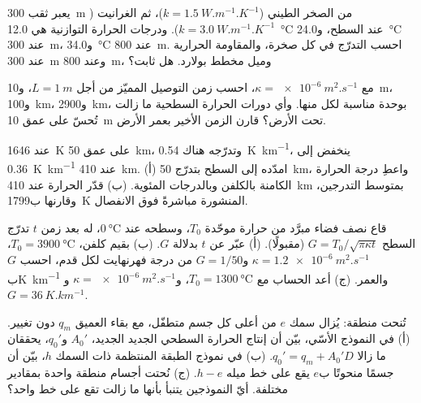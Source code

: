 \begin{exercise}[$\star\star$]\label{exo:b1:heat-budget:6}
يعبر ثقب \qty{300}{m} من الصخر الطيني ($k = \qty{1.5}{W.m^{-1}.K^{-1}}$)، ثم الغرانيت ($k = \qty{3.0}{W.m^{-1}.K^{-1}}$). ودرجات الحرارة التوازنية هي \qty{12.0}{\degreeCelsius} عند السطح، و\qty{24.0}{\degreeCelsius} عند \qty{300}{m}، و\qty{34.0}{\degreeCelsius} عند \qty{800}{m}. احسب التدرّج  في كل صخرة، والمقاومة الحرارية عند \qty{300}{m} وعند \qty{800}{m}، وميل مخطط بولارد. هل  ثابت؟
\end{exercise}

\begin{exercise}[$\star\star$]\label{exo:b1:heat-budget:7}
مع $\kappa = \qty{e-6}{m^2.s^{-1}}$، احسب زمن التوصيل المميّز من أجل $L = \qty{1}{m}$، و\qty{10}{m}، و\qty{100}{km}، و\qty{2900}{km}، بوحدة مناسبة لكل منها. وأي دورات الحرارة السطحية ما زالت تُحسّ على عمق \qty{10}{m} تحت الأرض؟ قارن الزمن الأخير بعمر الأرض.
\end{exercise}

\begin{exercise}[$\star\star$]\label{exo:b1:heat-budget:8}
 عند \qty{1646}{K} على عمق \qty{50}{km}، وتدرّجه هناك \qty{0.54}{K.km^{-1}}، ينخفض إلى \qty{0.36}{K.km^{-1}} عند \qty{410}{km}. (أ) امدّده إلى السطح بتدرّج \qty{50}{km}، واعطِ درجة الحرارة الكامنة بالكلفن وبالدرجات المئوية. (ب) قدّر الحرارة عند \qty{410}{km} بمتوسط التدرجين، وقارنها ب\qty{1799}{K} المنشورة مباشرةً فوق الانفصال.
\end{exercise}

\begin{exercise}[$\star\star$]\label{exo:b1:heat-budget:9}
قاع نصف فضاء مبرَّد من حرارة موحّدة $T_0$، وسطحه عند $\qty{0}{\degreeCelsius}$، له بعد زمن $t$ تدرّج السطح $G =
T_0/\sqrt{\pi\kappa t}$ (مقبولًا). (أ) عبّر عن $t$ بدلالة $G$. (ب) بقيم كلفن، $T_0 = \qty{3900}{\degreeCelsius}$، $\kappa =
\qty{1.2e-6}{m^2.s^{-1}}$ و$G = 1/50$ من درجة فهرنهايت لكل قدم، احسب $G$ ب\unit{K.km^{-1}} والعمر. (ج) أعد الحساب مع $T_0 =
\qty{1300}{\degreeCelsius}$، و$\kappa = \qty{e-6}{m^2.s^{-1}}$ و$G =
\qty{36}{K.km^{-1}}$.
\end{exercise}

\begin{exercise}[$\star\star\star$]\label{exo:b1:heat-budget:10}
تُنحت منطقة: يُزال سمك $e$ من أعلى كل جسم متطفّل، مع بقاء  العميق $q_m$ دون تغيير. (أ) في النموذج الأسّي، بيّن أن إنتاج الحرارة السطحي الجديد  الجديد، $A_0'$ و$q_0'$، يحققان ما زالا $q_0' = q_m + A_0'D$. (ب) في نموذج الطبقة المنتظمة ذات السمك $h$، بيّن أن جسمًا منحوتًا ب$e$ يقع على خط ميله $h - e$. (ج) نُحتت أجسام منطقة واحدة بمقادير مختلفة. أيّ النموذجين يتنبأ بأنها ما زالت تقع على خط واحد؟
\end{exercise}


